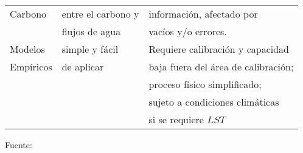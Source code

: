 \begin{longtable}{l|l|l}
Carbono         & entre el carbono y       & información, afectado por           \\
                & flujos de agua           & vacíos y/o errores.                  \\ \hline
Modelos         & simple y fácil           & Requiere calibración y capacidad     \\
Empíricos       & de aplicar               & baja fuera del área de calibración; \\
                &                          & proceso físico simplificado;      \\
                &                          & sujeto a condiciones climáticas     \\
                &                          & si se requiere $LST$                   \\ \hline
\end{longtable}
\vspace*{-1.25cm}
Fuente: \citet{zhang2016review}

